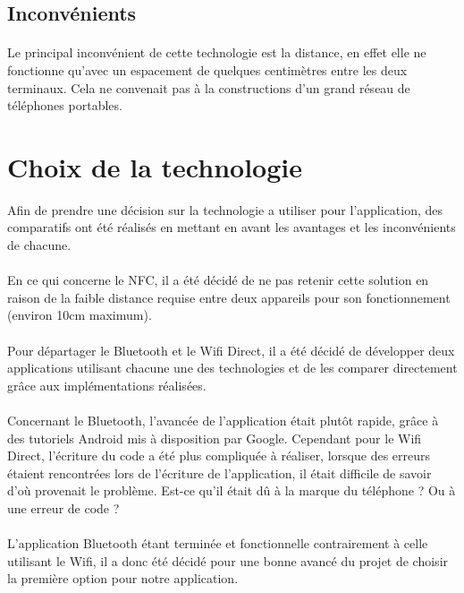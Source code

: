 \documentclass[a4paper,10pt]{report}
\begin{document}
    \subsection{Inconvénients}
    \paragraph{}
    Le principal inconvénient de cette technologie est la distance, en effet elle ne fonctionne qu'avec un espacement de quelques centimètres entre les deux terminaux.  Cela ne convenait pas à la constructions d'un grand réseau de téléphones portables.
  \section{Choix de la technologie}
  
  Afin de prendre une décision sur la technologie a utiliser pour l'application, des comparatifs ont été réalisés en mettant en avant les avantages et les inconvénients de chacune. 
  \paragraph{}
  En ce qui concerne le NFC, il a été décidé de ne pas retenir cette solution en raison de la faible distance requise entre deux appareils pour son fonctionnement (environ 10cm maximum).
  \paragraph{}
  Pour départager le Bluetooth et le Wifi Direct, il a été décidé de développer deux applications utilisant chacune une des technologies et de les comparer directement grâce aux implémentations réalisées.
  \paragraph{}
  Concernant le Bluetooth, l'avancée de l'application était plutôt rapide, grâce à des tutoriels Android mis à disposition par Google. Cependant pour le Wifi Direct, l'écriture du code a été plus compliquée à réaliser, lorsque des erreurs étaient rencontrées lors de l'écriture de l'application, il était difficile de savoir d'où provenait le problème. Est-ce qu'il était dû à la marque du téléphone ? Ou à une erreur de code ? 
  \paragraph{} 
  L'application Bluetooth étant terminée et fonctionnelle contrairement à celle utilisant le Wifi, il a donc été décidé pour une bonne avancé du projet de choisir la première option pour notre application.
  
\end{document}
